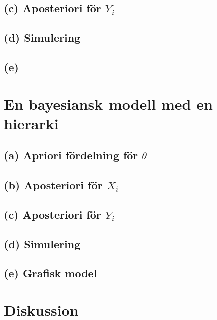 \documentclass{assignment}
\begin{document}
\subsection*{(c) Aposteriori för $Y_i$}
\subsection*{(d) Simulering}
\subsection*{(e)}
\section{En bayesiansk modell med en hierarki}
\subsection*{(a) Apriori fördelning för $\theta$} 
\subsection*{(b) Aposteriori för $X_i$}
\subsection*{(c) Aposteriori för $Y_i$}
\subsection*{(d) Simulering}
\subsection*{(e) Grafisk model}
\section{Diskussion}

%  
\end{document}

